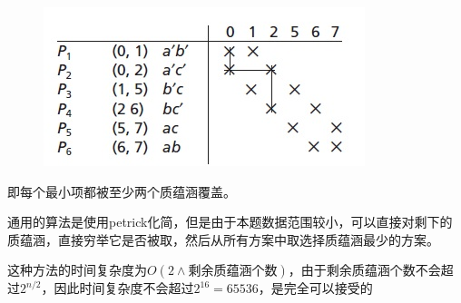 	\begin{figure}[h]
		\centering
		\includegraphics[scale=1]{images/petrick.jpg}
	\end{figure}

	即每个最小项都被至少两个质蕴涵覆盖。
	
	通用的算法是使用petrick化简，但是由于本题数据范围较小，可以直接对剩下的质蕴涵，直接穷举它是否被取，然后从所有方案中取选择质蕴涵最少的方案。
	
	这种方法的时间复杂度为$O(2 \land \mbox{剩余质蕴涵个数})$，由于剩余质蕴涵个数不会超过$2 ^ {n/2}$，因此时间复杂度不会超过$2 ^ {16} = 65536$，是完全可以接受的
	
		
